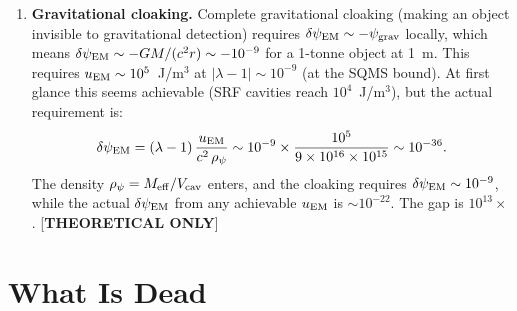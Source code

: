\documentclass[11pt]{article}
\newcommand{\lam}{\lambda}
\newcommand{\Meff}{M_{\rm eff}}
\newcommand{\ee}[1]{\times 10^{#1}}
\newcommand{\Vcav}{V_{\rm cav}}
\newcommand{\lbone}{|\lam - 1|}
\newcommand{\psigrav}{\psi_{\rm grav}}
\newcommand{\dpsiEM}{\delta\psi_{\rm EM}}
\theoremstyle{definition}
\theoremstyle{remark}
\begin{document}
\begin{tcolorbox}[colback=green!3!white, colframe=green!50!black,
  title=\textbf{P1: What Survives (Theory Only)}]
\begin{enumerate}[label=\textbf{S\arabic*.}, itemsep=4pt]
\item \textbf{Gravitational cloaking.}
  Complete gravitational cloaking (making an object invisible to
  gravitational detection) requires $\dpsiEM \sim -\psigrav$ locally,
  which means $\dpsiEM \sim -GM/(c^2 r) \sim -10^{-9}$ for a 1-tonne
  object at 1~m. This requires $u_{\rm EM} \sim 10^{5}$~J/m$^3$ at
  $\lbone \sim 10^{-9}$ (at the SQMS bound). At first glance this
  seems achievable (SRF cavities reach $10^4$~J/m$^3$), but the
  actual requirement is:
  \begin{equation}
  \dpsiEM = (\lam-1)\,\frac{u_{\rm EM}}{c^2\,\rho_\psi}
  \sim 10^{-9}\times\frac{10^5}{9\ee{16}\times 10^{15}}
  \sim 10^{-36}.
  \end{equation}
  The density $\rho_\psi = \Meff/\Vcav$ enters, and the cloaking
  requires $\dpsiEM \sim 10^{-9}$, while the actual $\dpsiEM$
  from any achievable $u_{\rm EM}$ is $\sim 10^{-22}$. The gap
  is $10^{13}\times$. [\textbf{THEORETICAL ONLY}]
\end{enumerate}
\end{tcolorbox}

\section{What Is Dead}
\label{sec:P1_dead}
\end{document}

